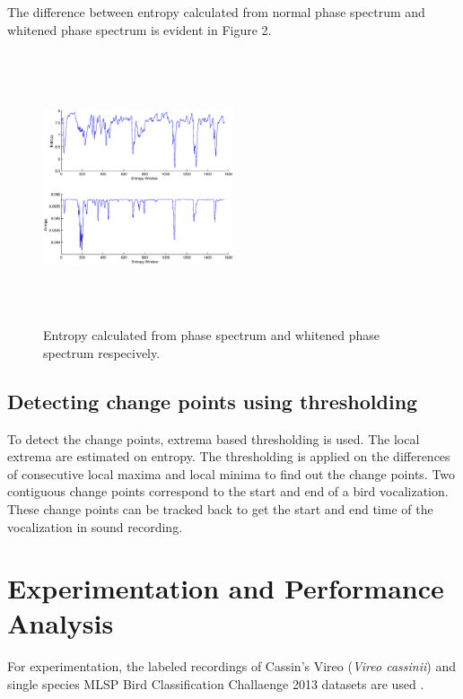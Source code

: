 \documentclass[a4paper]{article}
\begin{document}
The difference between entropy calculated from normal phase spectrum and whitened phase spectrum is evident in Figure 2.

\begin{figure}[h]
\centering
\includegraphics[width=0.5\textwidth,height=8cm]{Entropy_gd_white_non_white.eps}
\caption{Entropy calculated from phase spectrum and whitened phase spectrum respecively.}
\label{fig:entropy}
\end{figure}



\subsection{Detecting change points using thresholding}



   
To detect the change points, extrema based thresholding is used. The local extrema are estimated on entropy.  The thresholding is applied on the differences of consecutive local maxima and local minima to find out the change points.  Two contiguous change points correspond to the start and end of a bird vocalization. These change points can be tracked back to get the start and end time of the vocalization in sound recording.     
   
   
   




\section{Experimentation and Performance Analysis}

For experimentation, the labeled recordings of Cassin’s Vireo (\textit{Vireo cassinii}) \cite{data1} and single species MLSP Bird Classification Challaenge 2013 datasets are used \cite{data2}. 
\end{document}
